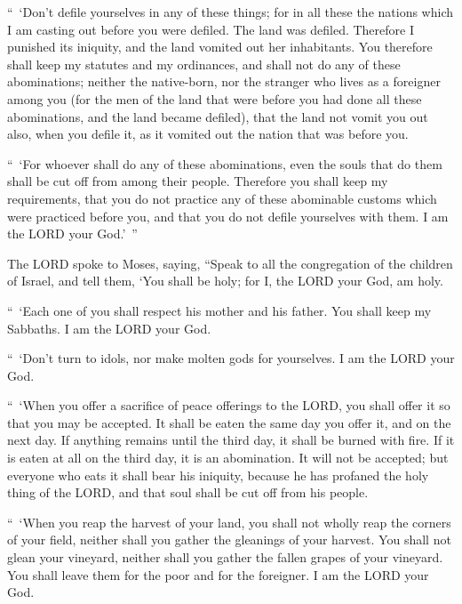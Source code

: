\myverse{}“ ‘Don’t defile yourselves in any of these things; for in all
these the nations which I am casting out before you were defiled.
\myverse{}The land was defiled. Therefore I punished its iniquity, and the land vomited
out her inhabitants.
\myverse{}You therefore shall keep my statutes and my ordinances, and shall not do
any of these abominations; neither the native-born, nor the stranger who lives as a foreigner among you
\myverse{}(for the men of the land that were before you had done all these abominations,
and the land became defiled),
\myverse{}that the land not vomit you out also, when you defile it, as it vomited out
the nation that was before you.


\myverse{}“ ‘For whoever shall do any of these abominations, even the souls
that do them shall be cut off from among their people.
\myverse{}Therefore you shall keep my requirements, that you do not practice any of
these abominable customs which were practiced before you, and that you do not defile yourselves with them.
I am the LORD your God.’ ”


\mychapter{} \myverse*{}The LORD spoke to Moses, saying,
\myverse{}“Speak to all the congregation of the children of Israel, and tell them, ‘You
shall be holy; for I, the LORD your God, am holy.


\myverse{}“ ‘Each one of you shall respect his mother and his father. You
shall keep my Sabbaths. I am the LORD your God.


\myverse{}“ ‘Don’t turn to idols, nor make molten gods for yourselves. I
am the LORD your God.


\myverse{}“ ‘When you offer a sacrifice of peace offerings to the LORD, you
shall offer it so that you may be accepted.
\myverse{}It shall be eaten the same day you offer it, and on the next day. If anything
remains until the third day, it shall be burned with fire.
\myverse{}If it is eaten at all on the third day, it is an abomination. It will not be
accepted;
\myverse{}but everyone who eats it shall bear his iniquity, because he has profaned the
holy thing of the LORD, and that soul shall be cut off from his people.


\myverse{}“ ‘When you reap the harvest of your land, you shall not wholly
reap the corners of your field, neither shall you gather the gleanings of your harvest.
\myverse{}You shall not glean your vineyard, neither shall you gather the fallen grapes
of your vineyard. You shall leave them for the poor and for the foreigner. I am the LORD your God.


